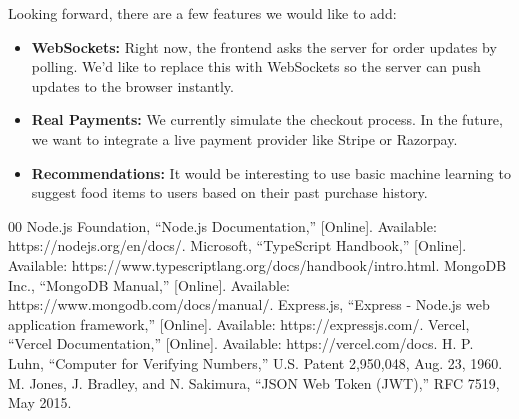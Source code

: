 \documentclass[conference]{IEEEtran}
\begin{document}
Looking forward, there are a few features we would like to add:
\begin{itemize}
\item \textbf{WebSockets:} Right now, the frontend asks the server for order updates by polling. We'd like to replace this with WebSockets so the server can push updates to the browser instantly.
\item \textbf{Real Payments:} We currently simulate the checkout process. In the future, we want to integrate a live payment provider like Stripe or Razorpay.
\item \textbf{Recommendations:} It would be interesting to use basic machine learning to suggest food items to users based on their past purchase history.
\end{itemize}

\begin{thebibliography}{00}
 Node.js Foundation, ``Node.js Documentation,'' [Online]. Available: https://nodejs.org/en/docs/.
 Microsoft, ``TypeScript Handbook,'' [Online]. Available: https://www.typescriptlang.org/docs/handbook/intro.html.
 MongoDB Inc., ``MongoDB Manual,'' [Online]. Available: https://www.mongodb.com/docs/manual/.
 Express.js, ``Express - Node.js web application framework,'' [Online]. Available: https://expressjs.com/.
 Vercel, ``Vercel Documentation,'' [Online]. Available: https://vercel.com/docs.
 H. P. Luhn, ``Computer for Verifying Numbers,'' U.S. Patent 2,950,048, Aug. 23, 1960.
 M. Jones, J. Bradley, and N. Sakimura, ``JSON Web Token (JWT),'' RFC 7519, May 2015.
\end{thebibliography}
\end{document}
